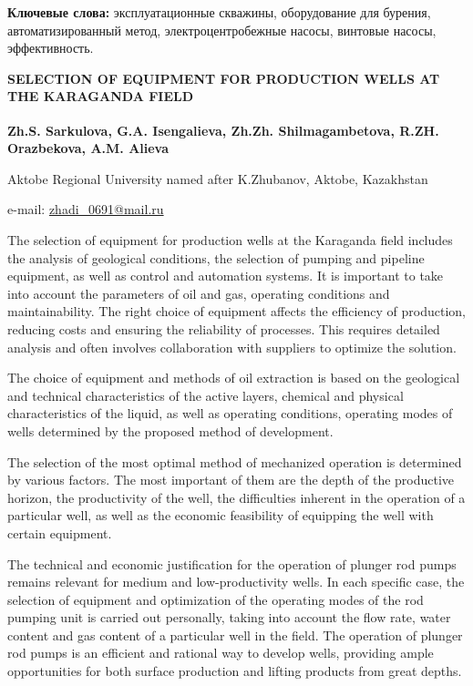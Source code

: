 {\bfseries Ключевые слова:} эксплуатационные скважины, оборудование для
бурения, автоматизированный метод, электроцентробежные насосы, винтовые
насосы, эффективность.

\begin{articleheader}
{\bfseries SELECTION OF EQUIPMENT FOR PRODUCTION WELLS AT THE KARAGANDA FIELD}

{\bfseries
Zh.S. Sarkulova\textsuperscript{\envelope },
G.A. Isengalieva,
Zh.Zh. Shilmagambetova,
R.ZH. Orazbekova,
A.M. Alieva
}
\end{articleheader}

\begin{affiliation}
Aktobe Regional University named after K.Zhubanov, Aktobe, Kazakhstan

e-mail: \href{mailto:zhadi_0691@mail.ru}{zhadi\_0691@mail.ru}
\end{affiliation}

The selection of equipment for production wells at the Karaganda field
includes the analysis of geological conditions, the selection of pumping
and pipeline equipment, as well as control and automation systems. It is
important to take into account the parameters of oil and gas, operating
conditions and maintainability. The right choice of equipment affects
the efficiency of production, reducing costs and ensuring the
reliability of processes. This requires detailed analysis and often
involves collaboration with suppliers to optimize the solution.

The choice of equipment and methods of oil extraction is based on the
geological and technical characteristics of the active layers, chemical
and physical characteristics of the liquid, as well as operating
conditions, operating modes of wells determined by the proposed method
of development.

The selection of the most optimal method of mechanized operation is
determined by various factors. The most important of them are the depth
of the productive horizon, the productivity of the well, the
difficulties inherent in the operation of a particular well, as well as
the economic feasibility of equipping the well with certain equipment.

The technical and economic justification for the operation of plunger
rod pumps remains relevant for medium and low-productivity wells. In
each specific case, the selection of equipment and optimization of the
operating modes of the rod pumping unit is carried out personally,
taking into account the flow rate, water content and gas content of a
particular well in the field. The operation of plunger rod pumps is an
efficient and rational way to develop wells, providing ample
opportunities for both surface production and lifting products from
great depths.


